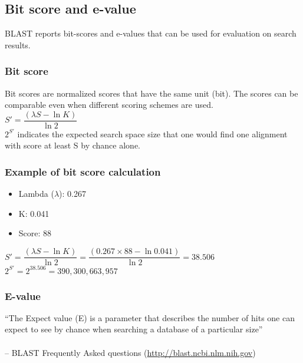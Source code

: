 %
%

%
%
\subsection{Bit score and e-value}
BLAST reports bit-scores and e-values that can be used for evaluation on search results.

%
%
\subsubsection*{Bit score} 
Bit scores are normalized scores that have the same unit (bit). The scores can be comparable even when different scoring schemes are used. \\

$S' = \dfrac{(\lambda S - \ln K)}{\ln⁡ 2}$ \\

\noindent
$2^{S'}$ indicates the expected search space size that one would find one alignment with score at least S by chance alone.
 
%
%
\subsubsection*{Example of bit score calculation} 
\begin{itemize}
\item Lambda ($\lambda$): 0.267
\item K: 0.041
\item Score: 88
\end{itemize}

$S' = \dfrac{(\lambda S - \ln⁡ K)}{\ln⁡ 2} = \dfrac{(0.267 \times 88 -  \ln⁡ 0.041)}{\ln⁡ 2} = 38.506$\\

$2^{S'} = 2^{38.506} = 390,300,663,957$

%
%
\subsubsection*{E-value} 
``The Expect value (E) is a parameter that describes the number of hits one can expect to see by chance when searching a database of a particular size'' \\ \\
-- BLAST Frequently Asked questions (\href{http://blast.ncbi.nlm.nih.gov}{http://blast.ncbi.nlm.nih.gov}) \\

